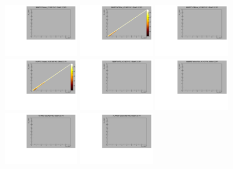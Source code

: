 \begin{center}

  \includegraphics[width=0.245\textwidth]{plots/response_matrix/Proton_KE_FHC_CC1Pi_10MeV.pdf}
  \includegraphics[width=0.245\textwidth]{plots/response_matrix/PiPlus_KE_FHC_CC1Pi_10MeV.pdf}
  \includegraphics[width=0.245\textwidth]{plots/response_matrix/PiMinus_KE_FHC_CC1Pi_10MeV.pdf}
  \includegraphics[width=0.245\textwidth]{plots/response_matrix/Charged_Pi_KE_FHC_CC1Pi_10MeV.pdf}
  \includegraphics[width=0.245\textwidth]{plots/response_matrix/Pi0_KE_FHC_CC1Pi_10MeV.pdf}
  \includegraphics[width=0.245\textwidth]{plots/response_matrix/Proton+Pion_KE_FHC_CC1Pi_10MeV.pdf}
  \includegraphics[width=0.245\textwidth]{plots/response_matrix/Total_FHC_CC1Pi_10MeV.pdf}
  \includegraphics[width=0.245\textwidth]{plots/response_matrix/Hadrons_FHC_CC1Pi_10MeV.pdf}

\end{center}

